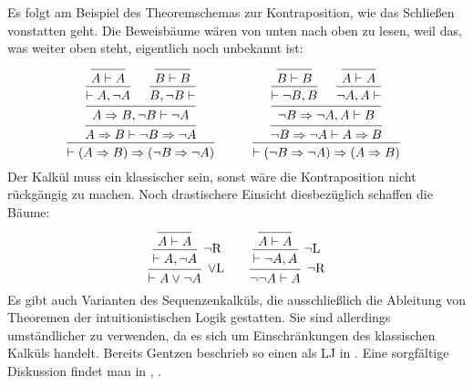 Es folgt am Beispiel des Theoremschemas zur Kontraposition, wie das
Schließen vonstatten geht. Die Beweisbäume wären von unten nach oben
zu lesen, weil das, was weiter oben steht, eigentlich noch unbekannt ist:
\[\begin{array}{@{}l@{\qquad\quad}l}
\begin{prooftree}
        \infer0{A\vdash A}
      \infer1{\vdash A, \lnot A}
        \infer0{B\vdash B}
      \infer1{B, \lnot B\vdash}
    \infer2{A\cond B, \lnot B\vdash\lnot A}
  \infer1{A\cond B\vdash\lnot B\cond\lnot A}
\infer1{\vdash (A\cond B)\cond (\lnot B\cond\lnot A)}
\end{prooftree}
&
\begin{prooftree}
        \infer0{B\vdash B}
      \infer1{\vdash \lnot B, B}
        \infer0{A\vdash A}
      \infer1{\lnot A, A\vdash}
    \infer2{\lnot B\cond\lnot A, A\vdash B}
  \infer1{\lnot B\cond\lnot A\vdash A\cond B}
\infer1{\vdash (\lnot B\cond\lnot A)\cond (A\cond B)}
\end{prooftree}
\end{array}\]
Der Kalkül muss ein klassischer sein, sonst wäre die Kontraposition
nicht rückgängig zu machen. Noch drastischere Einsicht diesbezüglich
schaffen die Bäume:
\[\begin{array}{l@{\qquad}l}
\begin{prooftree}
    \infer0{A\vdash A}
  \infer1[$\lnot$R]{\vdash A,\lnot A}
\infer1[$\lor$L]{\vdash A\lor\lnot A}
\end{prooftree}
&
\begin{prooftree}
    \infer0{A\vdash A}
  \infer1[$\lnot$L]{\vdash\lnot A, A}
\infer1[$\lnot$R]{\lnot\lnot A\vdash A}
\end{prooftree}
\end{array}\]
Es gibt auch Varianten des Sequenzenkalküls, die ausschließlich die
Ableitung von Theoremen der intuitionistischen Logik gestatten. Sie sind
allerdings umständlicher zu verwenden, da es sich um Einschränkungen des
klassischen Kalküls handelt. Bereits Gentzen beschrieb so einen
als LJ in \cite{Gentzen1935}. Eine sorgfältige Diskussion findet man
in \cite{Mimram}, \cite{von-Plato-Reasoning}.

